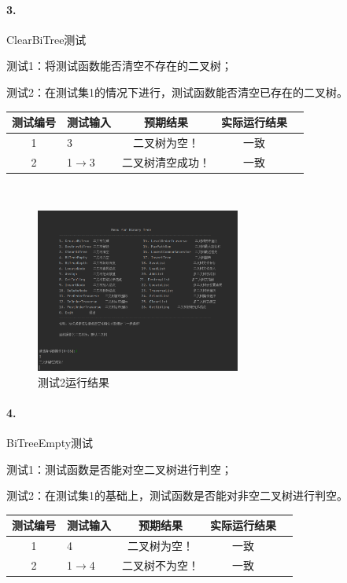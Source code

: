 \documentclass[supercite]{Experimental_Report}
\theoremstyle{definition}
\begin{document}
\paragraph{ 3.}ClearBiTree测试

测试1：将测试函数能否清空不存在的二叉树；

测试2：在测试集1的情况下进行，测试函数能否清空已存在的二叉树。

\vspace{0.5em}

\begin{tabular}{|c|l|c|c|c|}
	\hline
	测试编号 & 测试输入 & 预期结果 & 实际运行结果 \\
	\hline
	1 & 3 & 二叉树为空！ & 一致 \\
	\hline
	2 & 1$\rightarrow$3 & 二叉树清空成功！ & 一致 \\
	\hline
\end{tabular}

~\

\begin{figure}[H]
 	\centering
 	\includegraphics[width=0.6\textwidth]{images/二叉树测试3.png}
 	\caption{测试2运行结果}
 	\label{txlab}
 \end{figure}

\paragraph{ 4.}BiTreeEmpty测试

测试1：测试函数是否能对空二叉树进行判空；

测试2：在测试集1的基础上，测试函数是否能对非空二叉树进行判空。

\vspace{0.5em}

\begin{tabular}{|c|l|c|c|c|}
	\hline
	测试编号 & 测试输入 & 预期结果 & 实际运行结果 \\
	\hline
	1 & 4 & 二叉树为空！ & 一致 \\
	\hline
	2 & 1$\rightarrow$4 & 二叉树不为空！ & 一致 \\
	\hline
\end{tabular}
\end{document}
